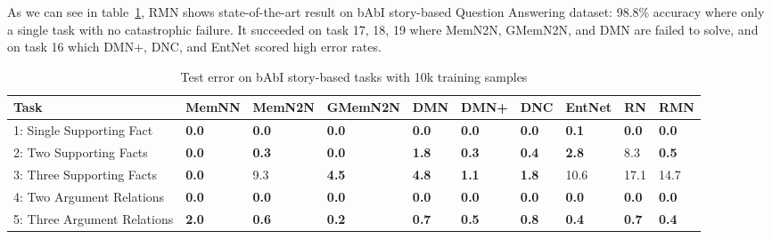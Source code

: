 \documentclass{article} \usepackage{iclr2018_conference,times}
\begin{document}
As we can see in table~\ref{table:babi_result}, RMN shows state-of-the-art result on bAbI story-based Question Answering dataset: 98.8\% accuracy where only a single task with no catastrophic failure. 
It succeeded on task 17, 18, 19 where MemN2N, GMemN2N, and DMN are failed to solve, and on task 16 which DMN+, DNC, and EntNet scored high error rates.


\begin{table}[t]
\centering
	\caption{Test error on bAbI story-based tasks with 10k training samples}
	\label{table:babi_result}
\begin{adjustbox}{max width=\textwidth}
\begin{tabular}{l|lllllllll}
\hline
Task                                 & \multicolumn{1}{c}{MemNN} & \multicolumn{1}{c}{MemN2N} & \multicolumn{1}{c}{GMemN2N} & \multicolumn{1}{c}{DMN} & \multicolumn{1}{c}{DMN+} & \multicolumn{1}{c}{DNC} & \multicolumn{1}{c}{EntNet\footnotemark }& \multicolumn{1}{c}{RN\footnotemark} & \multicolumn{1}{c}{RMN} \\ \hline
1: Single Supporting Fact            & \textbf{0.0}                       & \textbf{0.0}                        & \textbf{0.0} & \textbf{0.0}                     & \textbf{0.0}                      & \textbf{0.0}                     & \textbf{0.1}                        & \textbf{0.0}                    & \textbf{0.0}                     \\
2: Two Supporting Facts              & \textbf{0.0}                       & \textbf{0.3}                        & \textbf{0.0}                         & \textbf{1.8}                     & \textbf{0.3}                      & \textbf{0.4}                     & \textbf{2.8} & 8.3                    & \textbf{0.5}                     \\
3: Three Supporting Facts            & \textbf{0.0}                       & 9.3                        & \textbf{4.5                        } & \textbf{4.8}                     & \textbf{1.1}                      & \textbf{1.8}                     & 10.6                       & 17.1                  & 14.7                     \\
4: Two Argument Relations            & \textbf{0.0}                       & \textbf{0.0}                        & \textbf{0.0} & \textbf{0.0}                     & \textbf{0.0}                    & \textbf{0.0}                    & \textbf{0.0} & \textbf{0.0}                    & \textbf{0.0}                   \\
5: Three Argument Relations          & \textbf{2.0 }                      & \textbf{0.6}                        & \textbf{0.2 } & \textbf{0.7}                     & \textbf{0.5}                     &\textbf{0.8}                     &\textbf{0.4}                       & \textbf{0.7}                   & \textbf{0.4}                     \\

\end{tabular}
\end{adjustbox}
\end{table}
\end{document}
